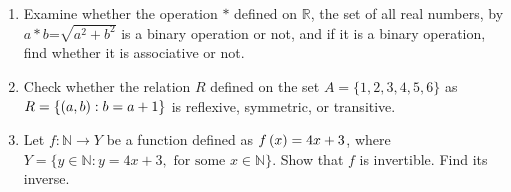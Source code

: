 \begin{enumerate}

\item Examine whether the operation $*$ defined on $\mathbb{R}$, the set of all real numbers, by $a*b$=${\sqrt{a^2 + b^2}}$ is a binary operation or not, and if it is a binary operation, find whether it is associative or not.
\item Check whether the relation $R$ defined on the set $A=\{1,2,3,4,5,6\}$ as\\
$R = \{\left(a, b\right) : b = a + 1\}$ is reflexive, symmetric, or transitive.
\item Let $f : \mathbb{N} \rightarrow Y$ be a function defined as $f\left(x\right) = 4x + 3$,
where $Y = \{y \in \mathbb{N} : y = 4x + 3, \text{ for some } x \in \mathbb{N}\}$. Show that $f$ is invertible. Find its inverse.       
\end{enumerate}
